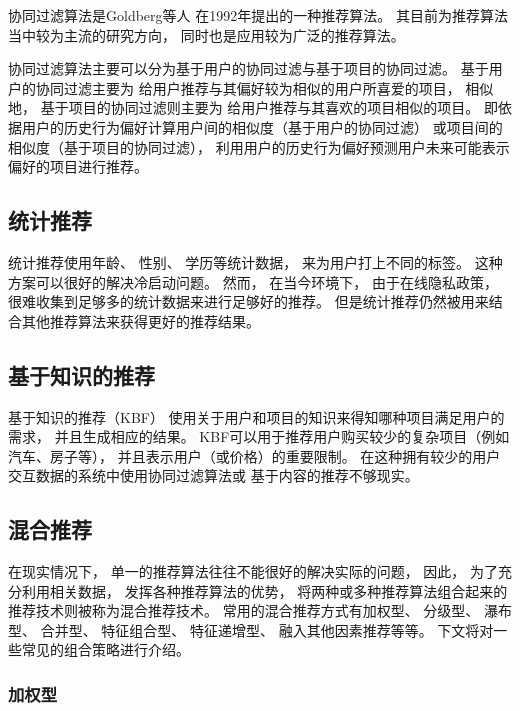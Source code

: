 协同过滤算法是Goldberg等人
\cite{goldbergUsingCollaborativeFiltering1992}
在1992年提出的一种推荐算法。
其目前为推荐算法当中较为主流的研究方向，
同时也是应用较为广泛的推荐算法。

协同过滤算法主要可以分为基于用户的协同过滤与基于项目的协同过滤。
基于用户的协同过滤主要为
给用户推荐与其偏好较为相似的用户所喜爱的项目，
相似地，
基于项目的协同过滤则主要为
给用户推荐与其喜欢的项目相似的项目。
即依据用户的历史行为偏好计算用户间的相似度（基于用户的协同过滤）
或项目间的相似度（基于项目的协同过滤），
利用用户的历史行为偏好预测用户未来可能表示偏好的项目进行推荐。

\subsection{统计推荐}

统计推荐使用年龄、
性别、
学历等统计数据，
来为用户打上不同的标签。
这种方案可以很好的解决冷启动问题。
然而，
在当今环境下，
由于在线隐私政策，
很难收集到足够多的统计数据来进行足够好的推荐。
但是统计推荐仍然被用来结合其他推荐算法来获得更好的推荐结果。

\subsection{基于知识的推荐}

基于知识的推荐（KBF）
使用关于用户和项目的知识来得知哪种项目满足用户的需求，
并且生成相应的结果\cite{burkeKnowledgeBasedRecommenderSystems2000}。
KBF可以用于推荐用户购买较少的复杂项目（例如汽车、房子等），
并且表示用户（或价格）的重要限制\cite{felfernigConstraintbasedRecommenderSystems2008}。
在这种拥有较少的用户交互数据的系统中使用协同过滤算法或
基于内容的推荐不够现实。

\subsection{混合推荐}

在现实情况下，
单一的推荐算法往往不能很好的解决实际的问题，
因此，
为了充分利用相关数据，
发挥各种推荐算法的优势，
将两种或多种推荐算法组合起来的推荐技术则被称为混合推荐技术。
常用的混合推荐方式有加权型、
分级型、
瀑布型、
合并型、
特征组合型、
特征递增型、
融入其他因素推荐等等。
下文将对一些常见的组合策略进行介绍\cite{heJiYuJuanJiShenJingWangLuoDeYinLeTuiJianXiTong2019}。

\subsubsection{加权型}

